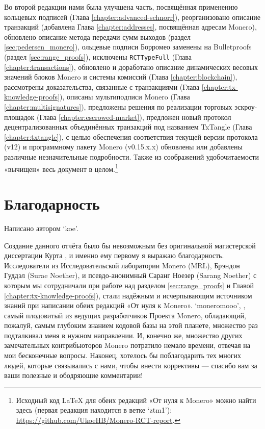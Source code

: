 Во второй редакции нами была улучшена часть, посвящённая применению кольцевых подпи\-сей (Глава \ref{chapter:advanced-schnorr}), реорганизовано описание транзакций (добавлена Глава \ref{chapter:addresses}, посвящённая адресам Monero), обновлено описание метода передачи сумм выходов (раздел \ref{sec:pedersen_monero}), ольцевые подписи Борромео заменены на Bulletproofs (раздел \ref{sec:range_proofs}), исключены {\tt RCTTypeFull} (Глава \ref{chapter:transactions}), обновлено и доработано описание динамических весовых значений блоков Monero и системы комиссий (Глава \ref{chapter:blockchain}), рассмотрены доказательства, связанные с транзакциями (Глава \ref{chapter:tx-knowledge-proofs}), описаны мульти\-подписи Monero (Глава \ref{chapter:multisignatures}), предложены решения по реализации торговых эскроу-площадок (Глава \ref{chapter:escrowed-market}), предложен новый протокол децентрализованных объединённых транзакций под названием TxTangle (Глава \ref{chapter:txtangle}), с целью обеспечения соответствия текущей версии протокола (v12) и программному пакету Monero (v0.15.x.x) обновлены или добавлены различные незна\-чительные подробности. Также из соображений удобочитаемости «вычищен» весь документ в целом.\footnote{Исходный код \LaTeX{} для обеих редакций «От нуля к Monero» можно найти здесь (первая редакция находится в ветке `ztm1'): \url{https://github.com/UkoeHB/Monero-RCT-report}.}



\section{Благодарность}
\label{sec:acknowledgements}

Написано автором `koe'.

Создание данного отчёта было бы невозможным без оригинальной магистерской диссертации Курта \cite{kurt-original}, и именно ему первому я выражаю благодарность. Исследователи из Исследова\-тельской лаборатории Monero (MRL), Брэндон Гуддэл (Surae Noether), и псевдо-анонимный Саранг Ноезер (Sarang Noether) с которым мы сотрудничали при работе над разделом \ref{sec:range_proofs} и Главой \ref{chapter:tx-knowledge-proofs}), стали надёжным и исчерпывающим источником знаний при написании обеих редакций «От нуля к Monero». `moneromooo', , самый плодовитый из ведущих разработчиков Проекта Monero, обладающий, пожалуй, самым глубоким знанием кодовой базы на этой планете, множество раз подталкивал меня в нужном направлении. И, конечно же, множество других замечательных контрибьюторов Monero потратило немало времени, отвечая на мои бесконеч\-ные вопросы. Наконец, хотелось бы поблагодарить тех многих людей, которые связывались с нами, чтобы внести коррективы — спасибо вам за ваши полезные и ободряющие комментарии!